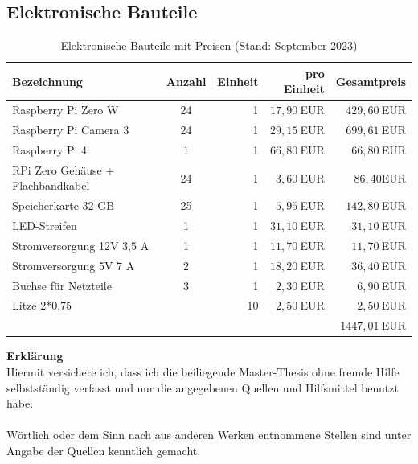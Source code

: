 \documentclass[a4paper,12pt,bibliography=totoc, listof=totoc,titlepage]{scrreprt}
\begin{document}
\begin{appendices}
    \section{Elektronische Bauteile}

    \begin{table}[h]
        \centering
        \begin{tabular}{l|c|r|r|r}
            Bezeichnung                       & Anzahl & Einheit & pro Einheit & Gesamtpreis   \\
            \hline
            Raspberry Pi Zero W               & 24     & 1       & $17,90~$EUR & $429,60~$EUR  \\
            Raspberry Pi Camera 3             & 24     & 1       & $29,15~$EUR & $699,61~$EUR  \\
            Raspberry Pi 4                    & 1      & 1       & $66,80~$EUR & $66,80~$EUR   \\
            RPi Zero Gehäuse + Flachbandkabel & 24     & 1       & $3,60~$EUR  & $86,40$EUR    \\
            Speicherkarte 32 GB               & 25     & 1       & $5,95~$EUR  & $142,80~$EUR  \\
            LED-Streifen                      & 1      & 1       & $31,10~$EUR & $31,10~$EUR   \\
            Stromversorgung 12V 3,5 A         & 1      & 1       & $11,70~$EUR & $11,70~$EUR   \\
            Stromversorgung 5V 7 A            & 2      & 1       & $18,20~$EUR & $36,40~$EUR   \\
            Buchse für Netzteile              & 3      & 1       & $2,30~$EUR  & $6,90~$EUR    \\
            Litze 2*0,75                      &        & 10      & $2,50~$EUR  & $2,50~$EUR    \\
                                              &        &         &             & $1447,01~$EUR \\
        \end{tabular}
        \caption{Elektronische Bauteile mit Preisen (Stand: September 2023)}
        \label{tab:bauteile_elektronisch}
    \end{table}
\end{appendices}

\newpage
\thispagestyle{empty}
\noindent\textbf{\large Erklärung}\\
Hiermit versichere ich, dass ich die beiliegende Master-Thesis ohne fremde Hilfe selbst\-stän\-dig verfasst und nur die angegebenen Quellen und Hilfsmittel benutzt habe.\\
\\
Wörtlich oder dem Sinn nach aus anderen Werken entnommene Stellen sind unter Angabe der Quellen kenntlich gemacht.
\\
\\
\\
\\
\\
\end{document}
